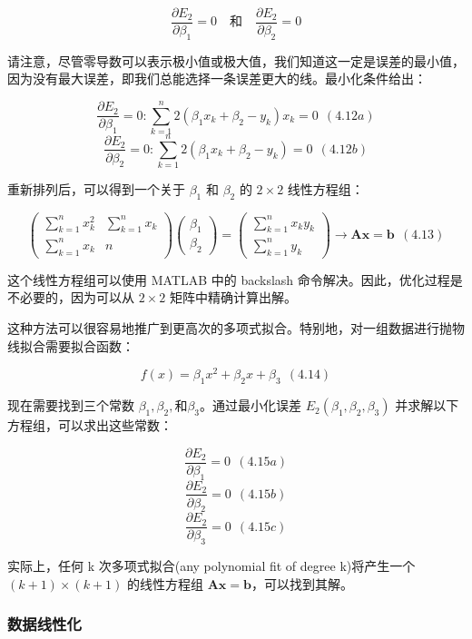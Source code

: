 \documentclass{ctexart}
\begin{document}
\[ \frac{\partial E_2}{\partial \beta_1} = 0 \quad \text{和} \quad \frac{\partial E_2}{\partial \beta_2} = 0 \]

请注意，尽管零导数可以表示极小值或极大值，我们知道这一定是误差的最小值，因为没有最大误差，即我们总能选择一条误差更大的线。最小化条件给出：

\[ \frac{\partial E_2}{\partial \beta_1} = 0: \sum_{k=1}^{n} 2(\beta_1 x_k + \beta_2 - y_k)x_k = 0 \ \ (4.12a) \]
\[ \frac{\partial E_2}{\partial \beta_2} = 0: \sum_{k=1}^{n} 2(\beta_1 x_k + \beta_2 - y_k) = 0 \ \ (4.12b) \]

重新排列后，可以得到一个关于 \(\beta_1\) 和 \(\beta_2\) 的 \(2 \times 2\) 线性方程组：

\[ \begin{pmatrix} \sum_{k=1}^{n} x_k^2 & \sum_{k=1}^{n} x_k \\ \sum_{k=1}^{n} x_k & n \end{pmatrix} \begin{pmatrix} \beta_1 \\ \beta_2 \end{pmatrix} = \begin{pmatrix} \sum_{k=1}^{n} x_k y_k \\ \sum_{k=1}^{n} y_k \end{pmatrix} \rightarrow \mathbf{Ax} = \mathbf{b} \ \ (4.13) \]

这个线性方程组可以使用 MATLAB 中的 backslash 命令解决。因此，优化过程是不必要的，因为可以从 \(2 \times 2\) 矩阵中精确计算出解。

这种方法可以很容易地推广到更高次的多项式拟合。特别地，对一组数据进行抛物线拟合需要拟合函数：

\[ f(x) = \beta_1 x^2 + \beta_2 x + \beta_3 \ \ (4.14) \]

现在需要找到三个常数 \(\beta_1, \beta_2, 和 \beta_3\)。通过最小化误差 \(E_2(\beta_1, \beta_2, \beta_3)\) 并求解以下方程组，可以求出这些常数：

\[ \frac{\partial E_2}{\partial \beta_1} = 0 \ \ (4.15a) \]
\[ \frac{\partial E_2}{\partial \beta_2} = 0 \ \ (4.15b) \]
\[ \frac{\partial E_2}{\partial \beta_3} = 0 \ \ (4.15c) \]

实际上，任何 k 次多项式拟合(any polynomial fit of degree k)将产生一个 \((k + 1) \times (k + 1)\) 的线性方程组 \(\mathbf{Ax} = \mathbf{b}\)，可以找到其解。

\subsubsection*{数据线性化}
\end{document}
